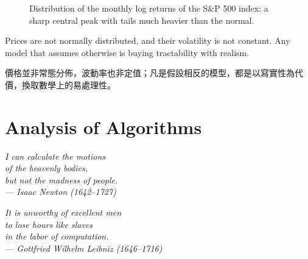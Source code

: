 \begin{figure}[H]
	\centering
	\caption{Distribution of the monthly log returns of the S\&P 500 index:
		a sharp central peak with tails much heavier than the normal.}
	\label{fig:sp500-density}
\end{figure}

\suppstart
\begin{moral}
	Prices are not normally distributed, and their volatility is not constant.
	Any model that assumes otherwise is buying tractability with realism.

	價格並非常態分佈，波動率也非定值；凡是假設相反的模型，都是以寫實性為代價，換取數學上的易處理性。
\end{moral}
\suppend

\section{Analysis of Algorithms}


\begin{flushright}
	\itshape I can calculate the motions\\
	of the heavenly bodies,\\
	but not the madness of people.\\
	\upshape --- Isaac Newton (1642--1727)

	\medskip

	\itshape It is unworthy of excellent men\\
	to lose hours like slaves\\
	in the labor of computation.\\
	\upshape --- Gottfried Wilhelm Leibniz (1646--1716)
\end{flushright}

